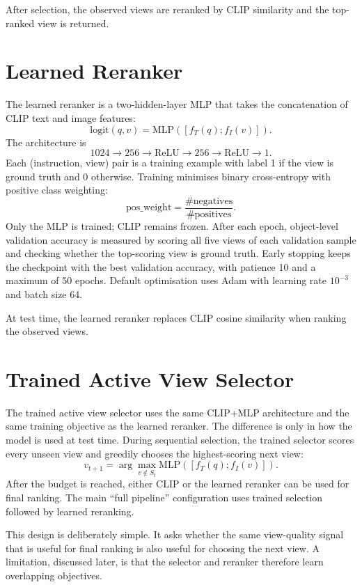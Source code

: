 After selection, the observed views are reranked by CLIP similarity and the top-ranked view is returned.

\section{Learned Reranker}

The learned reranker is a two-hidden-layer MLP that takes the concatenation of CLIP text and image features:
\[
\mathrm{logit}(q, v) = \mathrm{MLP}([f_T(q); f_I(v)]).
\]
The architecture is
\[
1024 \rightarrow 256 \rightarrow \mathrm{ReLU} \rightarrow 256 \rightarrow \mathrm{ReLU} \rightarrow 1.
\]
Each (instruction, view) pair is a training example with label 1 if the view is ground truth and 0 otherwise. Training minimises binary cross-entropy with positive class weighting:
\[
\mathrm{pos\_weight} = \frac{\#\mathrm{negatives}}{\#\mathrm{positives}}.
\]
Only the MLP is trained; CLIP remains frozen. After each epoch, object-level validation accuracy is measured by scoring all five views of each validation sample and checking whether the top-scoring view is ground truth. Early stopping keeps the checkpoint with the best validation accuracy, with patience 10 and a maximum of 50 epochs. Default optimisation uses Adam with learning rate \(10^{-3}\) and batch size 64.

At test time, the learned reranker replaces CLIP cosine similarity when ranking the observed views.

\section{Trained Active View Selector}

The trained active view selector uses the same CLIP+MLP architecture and the same training objective as the learned reranker. The difference is only in how the model is used at test time. During sequential selection, the trained selector scores every unseen view and greedily chooses the highest-scoring next view:
\[
v_{t+1} = \arg\max_{v \notin S_t} \mathrm{MLP}([f_T(q); f_I(v)]).
\]
After the budget is reached, either CLIP or the learned reranker can be used for final ranking. The main ``full pipeline'' configuration uses trained selection followed by learned reranking.

This design is deliberately simple. It asks whether the same view-quality signal that is useful for final ranking is also useful for choosing the next view. A limitation, discussed later, is that the selector and reranker therefore learn overlapping objectives.

